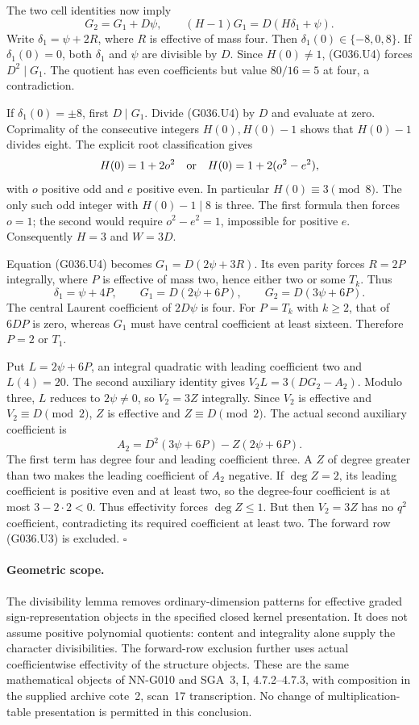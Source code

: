 The two cell identities now imply
\[
 G_2=G_1+D\psi,\qquad
                    (H-1)G_1=D(H\delta_1+\psi).     \tag{G036.U4}
\]
Write $\delta_1=\psi+2R$, where $R$ is effective
of mass four. Then $\delta_1(0)\in\{-8,0,8\}$.
If $\delta_1(0)=0$, both $\delta_1$ and $\psi$
are divisible by $D$. Since $H(0)\ne1$,
(G036.U4) forces $D^2\mid G_1$.
The quotient has even coefficients but value
$80/16=5$ at four, a contradiction.

If $\delta_1(0)=\pm8$, first $D\mid G_1$.
Divide (G036.U4) by $D$ and evaluate at zero.
Coprimality of the consecutive integers
$H(0),H(0)-1$ shows that $H(0)-1$ divides eight.
The explicit root classification gives
\[
 H(0)=1+2o^2\quad\hbox{or}\quad
 H(0)=1+2(o^2-e^2),
\]
with $o$ positive odd and $e$ positive even.
In particular $H(0)\equiv3\pmod8$.
The only such odd integer with $H(0)-1\mid8$
is three. The first formula then forces $o=1$;
the second would require $o^2-e^2=1$,
impossible for positive $e$.
Consequently $H=3$ and $W=3D$.

Equation (G036.U4) becomes
$G_1=D(2\psi+3R)$.
Its even parity forces $R=2P$ integrally, where
$P$ is effective of mass two, hence either two
or some $T_k$. Thus
\[
 \delta_1=\psi+4P,\qquad
 G_1=D(2\psi+6P),\qquad
 G_2=D(3\psi+6P).
\]
The central Laurent coefficient of $2D\psi$
is four. For $P=T_k$ with $k\ge2$, that of
$6DP$ is zero, whereas $G_1$ must have central
coefficient at least sixteen.
Therefore $P=2$ or $T_1$.

Put $L=2\psi+6P$, an integral quadratic with
leading coefficient two and $L(4)=20$.
The second auxiliary identity gives
$V_2L=3(DG_2-A_2)$.
Modulo three, $L$ reduces to $2\psi\ne0$,
so $V_2=3Z$ integrally.
Since $V_2$ is effective and $V_2\equiv D\pmod2$,
$Z$ is effective and $Z\equiv D\pmod2$.
The actual second auxiliary coefficient is
\[
              A_2=D^2(3\psi+6P)-Z(2\psi+6P).       \tag{G036.U5}
\]
The first term has degree four and leading
coefficient three. A $Z$ of degree greater
than two makes the leading coefficient of
$A_2$ negative. If $\deg Z=2$, its leading
coefficient is positive even and at least two,
so the degree-four coefficient is at most
$3-2\cdot2<0$.
Thus effectivity forces $\deg Z\le1$.
But then $V_2=3Z$ has no $q^2$ coefficient,
contradicting its required coefficient at least two.
The forward row (G036.U3) is excluded.
\hfill$\square$

\paragraph{Geometric scope.}
The divisibility lemma removes ordinary-dimension
patterns for effective graded sign-representation
objects in the specified closed kernel presentation.
It does not assume positive polynomial quotients:
content and integrality alone supply the character
divisibilities. The forward-row exclusion further
uses actual coefficientwise effectivity of the
structure objects. These are the same mathematical
objects of NN-G010 and SGA~3, I, 4.7.2--4.7.3,
with composition in the supplied archive
cote~2, scan~17 transcription. No change of
multiplication-table presentation is permitted
in this conclusion.
